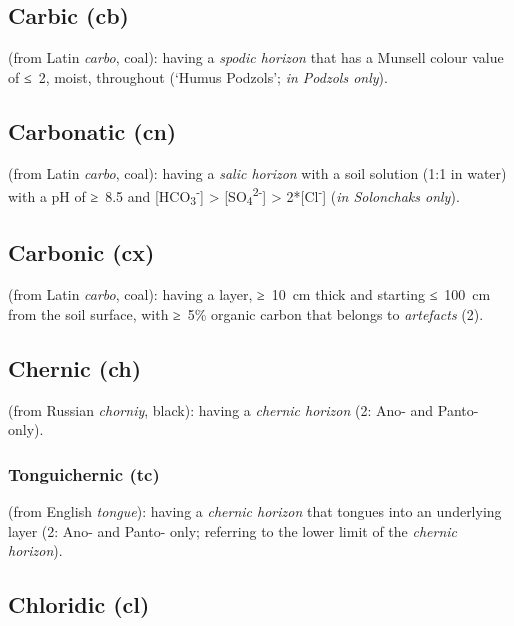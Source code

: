 \documentclass[
  letterpaper,
  DIV=11,
  numbers=noendperiod]{scrreprt}
\begin{document}
\hypertarget{carbic-cb}{%
\subsection{Carbic (cb)}\label{carbic-cb}}

(from Latin \emph{carbo}, coal): having a \emph{spodic horizon} that has
a Munsell colour value of ≤~2, moist, throughout (`Humus Podzols';
\emph{in Podzols only}).

\hypertarget{carbonatic-cn}{%
\subsection{Carbonatic (cn)}\label{carbonatic-cn}}

(from Latin \emph{carbo}, coal): having a \emph{salic horizon} with a
soil solution (1:1 in water) with a pH of ≥~8.5 and
{[}HCO\textsubscript{3}\textsuperscript{-}{]} \textgreater{}
{[}SO\textsubscript{4}\textsuperscript{2-}{]} \textgreater{}
2*{[}Cl\textsuperscript{-}{]} (\emph{in Solonchaks only}).

\hypertarget{carbonic-cx}{%
\subsection{Carbonic (cx)}\label{carbonic-cx}}

(from Latin \emph{carbo}, coal): having a layer, ≥~10~cm thick and
starting ≤~100~cm from the soil surface, with ≥~5\% organic carbon that
belongs to \emph{artefacts} (2).

\hypertarget{chernic-ch}{%
\subsection{Chernic (ch)}\label{chernic-ch}}

(from Russian \emph{chorniy}, black): having a \emph{chernic horizon}
(2: Ano- and Panto- only).

\hypertarget{tonguichernic-tc}{%
\subsubsection{Tonguichernic (tc)}\label{tonguichernic-tc}}

(from English \emph{tongue}): having a \emph{chernic horizon} that
tongues into an underlying layer (2: Ano- and Panto- only; referring to
the lower limit of the \emph{chernic horizon}).

\hypertarget{chloridic-cl}{%
\subsection{Chloridic (cl)}\label{chloridic-cl}}
\end{document}
